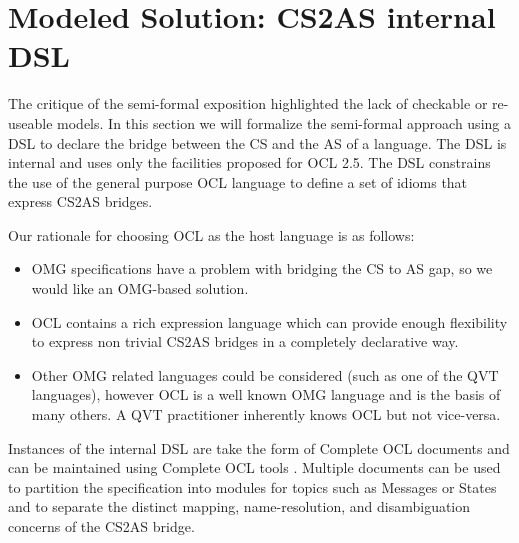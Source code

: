 \documentclass{llncs}
\begin{document}


\section{Modeled Solution: CS2AS internal DSL}
\label{sec:solution}

The critique of the semi-formal exposition highlighted the lack of checkable or re-useable models. In this section we will formalize the semi-formal approach using a DSL to declare the bridge between the CS and the AS of a language. The DSL is  internal\cite{fowler2010dsl} and uses only the facilities proposed for OCL 2.5. The DSL constrains the use of the general purpose OCL language to define  a set of idioms that express CS2AS bridges.

Our rationale for choosing OCL as the host language is as follows:
\begin{itemize}
\item OMG specifications have a problem with bridging the CS to AS gap, so we would like an OMG-based solution.
\item OCL contains a rich expression language which can provide enough flexibility to express non trivial CS2AS bridges in a completely declarative way.
\item Other OMG related languages could be considered (such as one of the QVT languages), however OCL is a well known OMG language and is the basis of many others. A QVT practitioner inherently knows OCL but not vice-versa.
\end{itemize}

Instances of the internal DSL are take the form of Complete OCL documents and can be maintained using Complete OCL tools \cite{eclipseOclOnline}. Multiple documents can be used to partition the specification into modules for topics such as Messages or States and to separate the distinct mapping, name-resolution, and disambiguation concerns of the CS2AS bridge.
\end{document}
